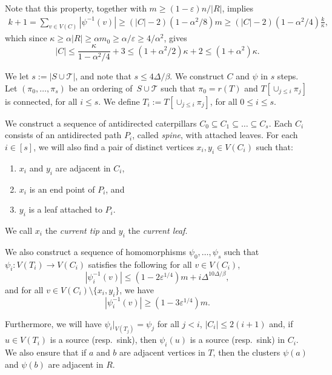 \documentclass[11pt]{article}
\numberwithin{equation}{section}
\newcommand{\inv}{^{-1}}
\renewcommand{\geq}{\geqslant}
\renewcommand{\leq}{\leqslant}
\newcommand{\defi}[1]{\emph{\color{red!50!black}#1}}
\def\inv{^{-1}}
\let\eps=\varepsilon
\newcommand{\cT}{\mathcal{T}}
\theoremstyle{definition}
\def\eps{{\varepsilon}}
\begin{document}
Note that this property, together with $m\geq (1-\eps)n/|R|$, implies
\begin{align*}
    k +1 = \sum_{v\in V(C)}|\psi\inv(v)| \geq (|C|-2)(1-\alpha^2/8)m\geq (|C|-2)(1-\alpha^2/4)\frac{k}{\kappa},
\end{align*}
which since $\kappa \geq \alpha|R|\geq \alpha m_0\geq \alpha/\eps \geq 4/\alpha^2$, gives 
\begin{equation}\label{eq:size_of_cat}
    |C|\leq \frac{\kappa}{1-\alpha^2/4}+3 \leq (1+\alpha^2/2)\kappa+2 \leq (1+\alpha^2)\kappa.
\end{equation}

We let $s := |S \cup \cT|$, and note that $s\leq 4\Delta/\beta$.
We construct $C$ and $\psi$ in $s$ steps. Let $(\pi_0,\dots,\pi_s)$ be an ordering of~${S \cup \cT}$ such
that $\pi_0 = r(T)$ and $T[\cup_{j \leq i} \pi_j]$ is connected, for all $i \leq s$. We define $T_i := T[\cup_{j \leq i} \pi_j]$,
for all $0 \leq i \leq s$.

We construct a sequence of antidirected caterpillars
$C_0\subseteq C_1\subseteq \dots \subseteq C_s$. Each $C_i$ consists of an antidirected path $P_i$, called \defi{spine}, with attached leaves.
For each $i\in [s]$, we will also find a pair of distinct vertices $x_i,y_i\in V(C_i)$ such that:
\begin{enumerate}[label = \textbf{(S\arabic*)}]
    \item $x_i$ and $y_i$ are adjacent in $C_i$,\label{S1}
    \item $x_i$ is an end point of $P_i$, and\label{S2}
    \item $y_i$ is a leaf attached to $P_i$.\label{S3}
\end{enumerate}
We call $x_i$ the \defi{current tip} and $y_i$ the \defi{current leaf}.

We also construct a sequence of homomorphisms $\psi_0,\dots,\psi_s$ such that $\psi_i:V(T_i)\longrightarrow V(C_i)$ satisfies the following for all $v\in V(C_i)$,
\begin{equation}
    \label{eq:space_in_cat}
    |\psi_i\inv(v)|\leq (1-2\eps^{1/4})m + i\Delta^{10\Delta/\beta},
\end{equation}
and for all $v\in V(C_i)\setminus \{x_i,y_i\}$, we have
\begin{equation}
    \label{eq:full_cat_i}
    |\psi_i\inv(v)|\geq (1-3\eps^{1/4})m.
\end{equation}

Furthermore, we will have $\psi_i|_{V(T_j)} = \psi_j$ for all $j<i$, $|C_i|\leq 2(i+1)$ and, if $u\in V(T_i)$ is a source (resp.\ sink), then $\psi_i(u)$ is a source (resp.\ sink) in $C_i$. We also ensure that if $a$ and $b$ are adjacent vertices in $T$, then the clusters $\psi(a)$ and $\psi(b)$ are adjacent in $R$.
\end{document}
